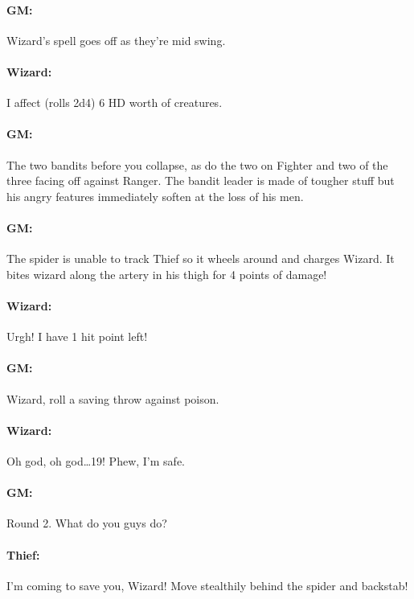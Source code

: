 \begin{multicols}{2}
\paragraph{GM:} Wizard's spell goes off as they're mid swing.  

\paragraph{Wizard:}  I affect (rolls 2d4) 6 HD worth of creatures.

\paragraph{GM:}  The two bandits before you collapse, as do the two on Fighter and two of the three facing off against Ranger.  The bandit leader is made of tougher stuff but his angry features immediately soften at the loss of his men.

\paragraph{GM:}  The spider is unable to track Thief so it wheels around and charges Wizard.  It bites wizard along the artery in his thigh for 4 points of damage!  

\paragraph{Wizard:}  Urgh!  I have 1 hit point left!

\paragraph{GM:}  Wizard, roll a saving throw against poison.

\paragraph{Wizard:}  Oh god, oh god\ldots 19!  Phew, I'm safe.

\paragraph{GM:} Round 2.  What do you guys do?

\paragraph{Thief:}  I'm coming to save you, Wizard!  Move stealthily behind the spider and backstab!


\end{multicols}
